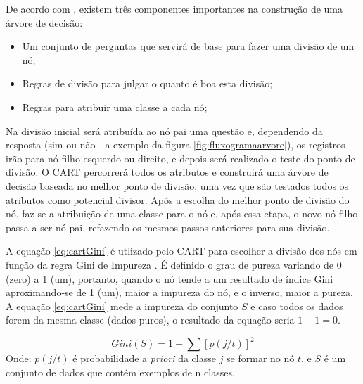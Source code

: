 De acordo com , existem três componentes importantes na construção de uma árvore de decisão:

\begin{itemize}
[noitemsep]
 \item Um conjunto de perguntas que servirá de base para fazer uma divisão de um nó;
 \item Regras de divisão para julgar o quanto é boa esta divisão;
 \item Regras para atribuir uma classe a cada nó;
\end{itemize}

Na divisão inicial será atribuída ao nó pai uma questão e,  dependendo da resposta (sim ou não - a exemplo da figura \ref{fig:fluxogramaarvore}), os registros irão para nó filho esquerdo ou direito, e depois será realizado o teste do ponto de divisão. O CART percorrerá todos os atributos e construirá uma árvore de decisão baseada no melhor ponto de divisão, uma vez que são testados todos os atributos como potencial divisor. Após a escolha do melhor ponto de divisão do nó, faz-se a atribuição de uma classe para o nó e, após essa etapa, o novo nó filho passa a ser nó pai, refazendo os mesmos passos anteriores para sua divisão.

A equação \ref{eq:cartGini} é utlizado pelo CART para escolher a divisão dos nós em função da regra Gini de Impureza \cite{breiman1984}. É definido o grau de pureza variando de 0 (zero) a 1 (um), portanto, quando o nó tende a um resultado de índice Gini aproximando-se de 1 (um), maior a impureza do nó, e o inverso, maior a pureza. A equação \ref{eq:cartGini} mede a impureza do conjunto ${S}$ e caso todos os dados forem da mesma classe (dados puros), o resultado da equação seria ${1-1=0}$.

\begin{equation}
Gini(S)= 1 - \sum [p(j/t)]^2
 \label{eq:cartGini}
\end{equation}
Onde: ${p(j/t)}$ é probabilidade a \textit{priori} da classe ${j}$ se formar no nó ${t}$, e ${S}$ é um conjunto de dados que contém exemplos de n classes.
 

